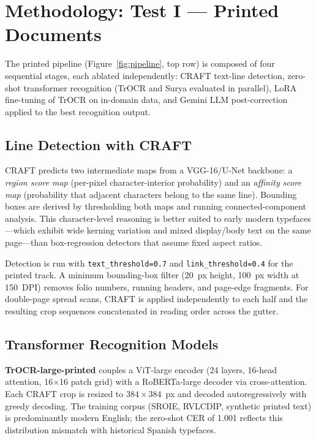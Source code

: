 \documentclass[11pt,a4paper]{article}
\begin{document}
\section{Methodology: Test I --- Printed Documents}

The printed pipeline (Figure~\ref{fig:pipeline}, top row) is composed of four sequential
stages, each ablated independently: CRAFT text-line detection, zero-shot transformer
recognition (TrOCR and Surya evaluated in parallel), LoRA fine-tuning of TrOCR on
in-domain data, and Gemini LLM post-correction applied to the best recognition output.

\subsection{Line Detection with CRAFT}

CRAFT \cite{craft2019} predicts two intermediate maps from a VGG-16/U-Net backbone: a
\emph{region score map} (per-pixel character-interior probability) and an \emph{affinity
score map} (probability that adjacent characters belong to the same line). Bounding boxes
are derived by thresholding both maps and running connected-component analysis.
This character-level reasoning is better suited to early modern typefaces---which exhibit
wide kerning variation and mixed display/body text on the same page---than box-regression
detectors that assume fixed aspect ratios.

Detection is run with \texttt{text\_threshold=0.7} and \texttt{link\_threshold=0.4} for
the printed track. A minimum bounding-box filter (20~px height, 100~px width at 150~DPI)
removes folio numbers, running headers, and page-edge fragments. For double-page spread
scans, CRAFT is applied independently to each half and the resulting crop sequences
concatenated in reading order across the gutter.

\subsection{Transformer Recognition Models}

\textbf{TrOCR-large-printed} \cite{trocr2021} couples a ViT-large encoder (24 layers,
16-head attention, 16$\times$16 patch grid) with a RoBERTa-large decoder via cross-attention.
Each CRAFT crop is resized to $384\times384$~px and decoded autoregressively with greedy
decoding. The training corpus (SROIE, RVLCDIP, synthetic printed text) is predominantly
modern English; the zero-shot CER of 1.001 reflects this distribution mismatch with
historical Spanish typefaces.
\end{document}
